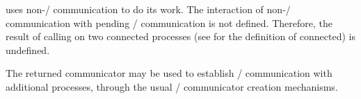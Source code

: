  uses non-\MPI/ communication to do its work.
The interaction of non-\MPI/ communication with pending \MPI/
communication is not defined. Therefore, the result of calling
 on two connected processes
(see  for the definition of connected) is
undefined.


The returned communicator may be used to establish \MPI/
communication with additional processes, through the usual \MPI/
communicator creation mechanisms.

